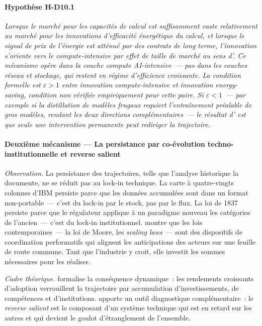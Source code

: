 \paragraph{Hypothèse H-D10.1}
\emph{Lorsque le marché pour les capacités de calcul est suffisamment vaste relativement au marché pour les innovations d'efficacité énergétique du calcul, et lorsque le signal de prix de l'énergie est atténué par des contrats de long terme, l'innovation s'oriente vers le compute-intensive par effet de taille de marché au sens d'\textcite{acemoglu_directed_2002}. Ce mécanisme opère dans la couche compute AI-intensive~--- pas dans les couches réseau et stockage, qui restent en régime d'efficience croissante. La condition formelle est $\varepsilon > 1$ entre innovation compute-intensive et innovation energy-saving, condition non vérifiée empiriquement pour cette paire. Si $\varepsilon < 1$~--- par exemple si la distillation de modèles frugaux requiert l'entraînement préalable de gros modèles, rendant les deux directions complémentaires~--- le résultat d'\textcite{acemoglu_environment_2012} est que seule une intervention permanente peut rediriger la trajectoire.}


\paragraph{Deuxième mécanisme --- La persistance par co-évolution techno-institutionnelle et reverse salient}

\markEVO \markSTS

\emph{Observation.} La persistance des trajectoires, telle que l'analyse historique la documente, ne se réduit pas au lock-in technique. La carte à quatre-vingts colonnes d'IBM persiste parce que les données accumulées sont dans un format non-portable~--- c'est du lock-in par le stock, pas par le flux. La loi de 1837 persiste parce que le régulateur applique à un paradigme nouveau les catégories de l'ancien~--- c'est du lock-in institutionnel. \textcite{roussilhe_phase_2025} montre que les \og lois\fg{} contemporaines~--- la loi de Moore, les \emph{scaling laws}~--- sont des dispositifs de coordination performatifs qui alignent les anticipations des acteurs sur une feuille de route commune. Tant que l'industrie y croit, elle investit les sommes nécessaires pour les réaliser.

\emph{Cadre théorique.}  \textcite{arthur_competing_1989} formalise la conséquence dynamique~: les rendements croissants d'adoption verrouillent la trajectoire par accumulation d'investissements, de compétences et d'institutions.  \textcite{hughes_networks_1983} apporte un outil diagnostique complémentaire~: le \emph{reverse salient} est le composant d'un système technique qui est en retard sur les autres et qui devient le goulot d'étranglement de l'ensemble.

